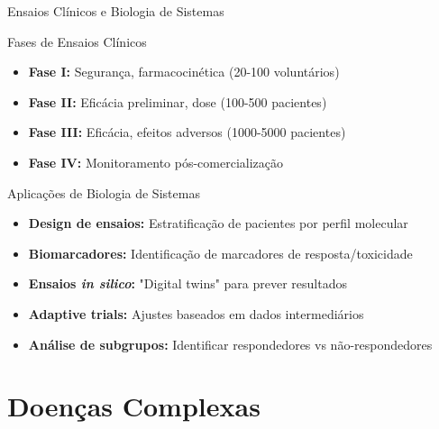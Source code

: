 \begin{frame}{Ensaios Clínicos e Biologia de Sistemas}
\begin{block}{Fases de Ensaios Clínicos}
\begin{itemize}
    \item \textbf{Fase I:} Segurança, farmacocinética (20-100 voluntários)
    \item \textbf{Fase II:} Eficácia preliminar, dose (100-500 pacientes)
    \item \textbf{Fase III:} Eficácia, efeitos adversos (1000-5000 pacientes)
    \item \textbf{Fase IV:} Monitoramento pós-comercialização
\end{itemize}
\end{block}

\vspace{0.3cm}

\begin{exampleblock}{Aplicações de Biologia de Sistemas}
\begin{itemize}
    \item \textbf{Design de ensaios:} Estratificação de pacientes por perfil molecular
    \item \textbf{Biomarcadores:} Identificação de marcadores de resposta/toxicidade
    \item \textbf{Ensaios \textit{in silico}:} "Digital twins" para prever resultados
    \item \textbf{Adaptive trials:} Ajustes baseados em dados intermediários
    \item \textbf{Análise de subgrupos:} Identificar respondedores vs não-respondedores
\end{itemize}
\end{exampleblock}
\end{frame}

\section{Doenças Complexas}

